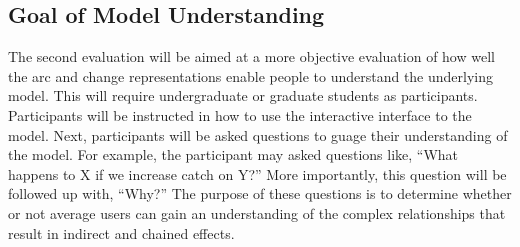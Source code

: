 \subsection{Goal of Model Understanding}

The second evaluation will be aimed at a more objective evaluation of how well the arc and change representations enable people to understand the underlying model.  This will require undergraduate or graduate students as participants.  Participants will be instructed in how to use the interactive interface to the model.  Next, participants will be asked questions to guage their understanding of the model.  For example, the participant may asked questions like, ``What happens to X if we increase catch on Y?''  More importantly, this question will be followed up with, ``Why?''  The purpose of these questions is to determine whether or not average users can gain an understanding of the complex relationships that result in indirect and chained effects.
